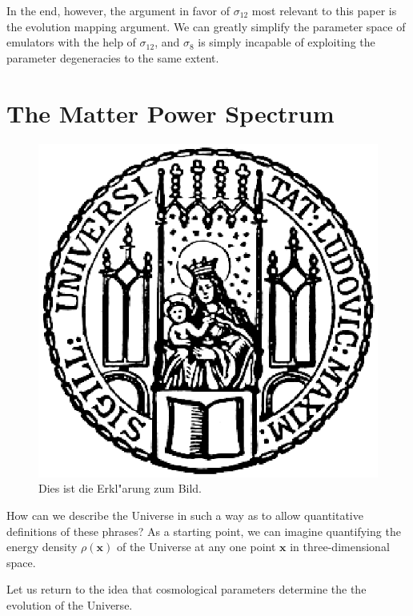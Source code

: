 In the end, however, the argument in favor of $\sigma_{12}$ most relevant to
this paper is the evolution mapping argument. We can greatly simplify the
parameter space of emulators with the help of $\sigma_{12}$, and $\sigma_8$
is simply incapable of exploiting the parameter degeneracies to the same
extent.
 

\section{The Matter Power Spectrum}
\label{sec: Pk_intro}


\begin{figure}[htb]
  \centering
  \includegraphics[scale=0.5]{siegel}
  \caption[Kurzform f"ur das Abbildungsverzeichnis]{Dies ist die Erkl"arung zum Bild.}
\end{figure}

How can we describe the Universe in such 
a way as to allow quantitative definitions of these phrases? As a starting 
point, we can imagine quantifying the energy density $\rho(\bm{x})$ of the
Universe at any one point $\bm{x}$ in three-dimensional space.

Let us return to the idea that cosmological parameters determine the the 
evolution of the Universe.

